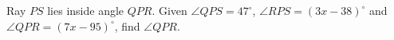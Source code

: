 Ray $PS$ lies inside angle $QPR$. Given $\angle QPS=47^\circ$, $\angle RPS=(3x-38)^\circ$ and $\angle QPR=(7x-95)^\circ$, find $\angle QPR$.
